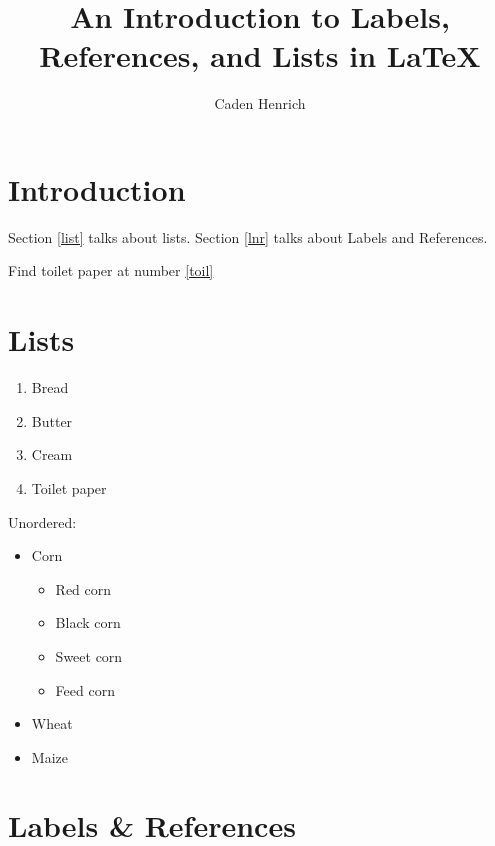 \documentclass{article}
\author{Caden Henrich}
\title{An Introduction to Labels, References, and Lists in {\LaTeX}}
\begin{document}
\maketitle

\section{Introduction}

Section \ref{list} talks about lists. Section \ref{lnr} talks about Labels and References.

Find toilet paper at number \ref{toil}

\section{Lists\label{list}}

\begin{enumerate}
    \item Bread
    \item Butter
    \item Cream
    \item Toilet paper\label{toil}
\end{enumerate}

Unordered:

\begin{itemize}
    \item Corn
        \begin{itemize}
            \item Red corn
            \item Black corn
            \item Sweet corn
            \item Feed corn
        \end{itemize}
    \item Wheat
    \item Maize
\end{itemize}

\section{Labels \& References\label{lnr}}
\end{document}
